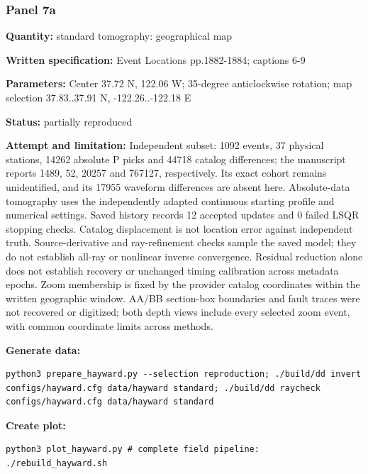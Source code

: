 \subsubsection*{Panel 7a}
\noindent\textbf{Quantity:} standard tomography: geographical map\par
\noindent\textbf{Written specification:} Event Locations pp.1882-1884; captions 6-9\par
\noindent\textbf{Parameters:} Center 37.72 N, 122.06 W; 35-degree anticlockwise rotation; map selection 37.83..37.91 N, -122.26..-122.18 E\par
\noindent\textbf{Status:} partially reproduced\par
\noindent\textbf{Attempt and limitation:} Independent subset: 1092 events, 37 physical stations, 14262 absolute P picks and 44718 catalog differences; the manuscript reports 1489, 52, 20257 and 767127, respectively. Its exact cohort remains unidentified, and its 17955 waveform differences are absent here. Absolute-data tomography uses the independently adapted continuous starting profile and numerical settings. Saved history records 12 accepted updates and 0 failed LSQR stopping checks. Catalog displacement is not location error against independent truth. Source-derivative and ray-refinement checks sample the saved model; they do not establish all-ray or nonlinear inverse convergence. Residual reduction alone does not establish recovery or unchanged timing calibration across metadata epochs. Zoom membership is fixed by the provider catalog coordinates within the written geographic window. AA/BB section-box boundaries and fault traces were not recovered or digitized; both depth views include every selected zoom event, with common coordinate limits across methods.\par
\noindent\textbf{Generate data:}
\begin{lstlisting}
python3 prepare_hayward.py --selection reproduction; ./build/dd invert configs/hayward.cfg data/hayward standard; ./build/dd raycheck configs/hayward.cfg data/hayward standard
\end{lstlisting}
\noindent\textbf{Create plot:}
\begin{lstlisting}
python3 plot_hayward.py # complete field pipeline: ./rebuild_hayward.sh
\end{lstlisting}
